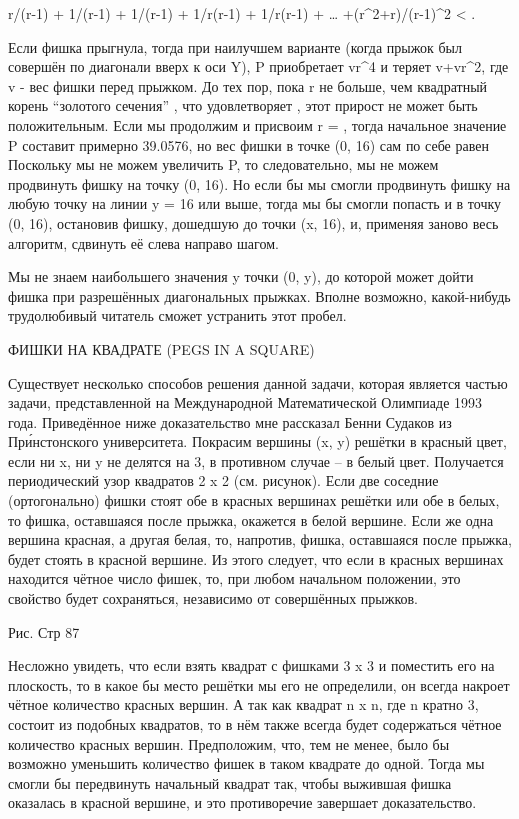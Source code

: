  r/(r-1) + 1/(r-1) + 1/(r-1) + 1/r(r-1) +  1/r(r-1) + … +(r^2+r)/(r-1)^2 < .


   Если фишка прыгнула, тогда при наилучшем варианте (когда прыжок был совершён по диагонали вверх к оси Y), P приобретает vr^4 и теряет v+vr^2, где v - вес фишки перед прыжком. До тех пор, пока r не больше, чем квадратный корень “золотого сечения” , что удовлетворяет , этот прирост не может быть положительным.
   Если мы продолжим и присвоим r = , тогда начальное значение P составит примерно 39.0576, но вес фишки в точке (0, 16) сам по себе равен  Поскольку мы не можем увеличить P, то следовательно, мы не можем продвинуть фишку на точку (0, 16).
Но если бы мы смогли продвинуть фишку на любую точку на линии  y = 16 или выше, тогда  мы бы смогли попасть и в точку (0, 16), остановив фишку, дошедшую до точки (x, 16), и, применяя заново весь алгоритм, сдвинуть её слева направо шагом.


   Мы не знаем наибольшего значения y точки (0, y), до которой может дойти фишка при разрешённых диагональных прыжках. Вполне возможно, какой-нибудь трудолюбивый читатель сможет устранить этот пробел.


ФИШКИ НА КВАДРАТЕ (PEGS IN A SQUARE)


   Существует несколько способов решения данной задачи, которая является частью задачи, представленной на Международной Математической Олимпиаде 1993 года.
Приведённое ниже доказательство мне рассказал Бенни Судаков из При́нстонского университета.
  Покрасим вершины (x, y) решётки  в красный цвет, если ни x,  ни y не делятся на 3, в противном случае -- в белый цвет. Получается периодический узор квадратов 2 x 2 (см. рисунок).
   Если две соседние (ортогонально) фишки стоят обе в красных вершинах решётки или обе в белых, то фишка, оставшаяся после прыжка, окажется в белой вершине. Если же одна вершина красная, а другая белая, то, напротив, фишка, оставшаяся после прыжка, будет стоять в красной вершине. Из этого следует, что если в красных вершинах находится чётное число фишек, то, при любом начальном положении, это свойство будет сохраняться, независимо от совершённых прыжков.


                          Рис. Стр 87


  Несложно увидеть, что если взять квадрат с фишками 3 x 3 и поместить его на плоскость, то в какое бы место решётки мы его не определили, он всегда накроет чётное количество красных вершин. А так как квадрат n x n, где  n кратно 3, состоит из подобных квадратов, то в нём также всегда будет содержаться чётное количество красных вершин.
Предположим, что, тем не менее, было бы возможно уменьшить количество фишек в таком квадрате до одной. Тогда мы смогли бы передвинуть начальный квадрат так, чтобы выжившая фишка оказалась в красной вершине, и это противоречие завершает доказательство.


